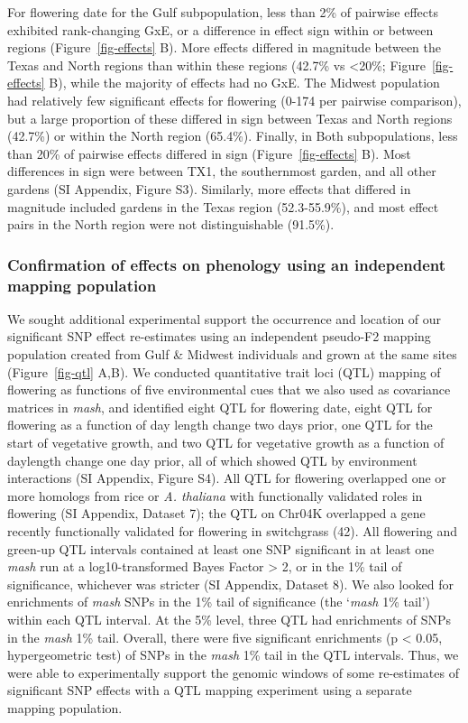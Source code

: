 \documentclass[
  9pt,
  twocolumn,
  twoside]{pnas-new}
\begin{document}
For flowering date for the Gulf subpopulation, less than 2\% of pairwise
effects exhibited rank-changing GxE, or a difference in effect sign
within or between regions (Figure~\ref{fig-effects} B). More effects
differed in magnitude between the Texas and North regions than within
these regions (42.7\% vs \textless20\%; Figure~\ref{fig-effects} B),
while the majority of effects had no GxE. The Midwest population had
relatively few significant effects for flowering (0-174 per pairwise
comparison), but a large proportion of these differed in sign between
Texas and North regions (42.7\%) or within the North region (65.4\%).
Finally, in Both subpopulations, less than 20\% of pairwise effects
differed in sign (Figure~\ref{fig-effects} B). Most differences in sign
were between TX1, the southernmost garden, and all other gardens (SI
Appendix, Figure S3). Similarly, more effects that differed in magnitude
included gardens in the Texas region (52.3-55.9\%), and most effect
pairs in the North region were not distinguishable (91.5\%).

\subsubsection{Confirmation of effects on phenology using an independent
mapping
population}\label{confirmation-of-effects-on-phenology-using-an-independent-mapping-population}

We sought additional experimental support the occurrence and location of
our significant SNP effect re-estimates using an independent pseudo-F2
mapping population created from Gulf \& Midwest individuals and grown at
the same sites (Figure~\ref{fig-qtl} A,B). We conducted quantitative
trait loci (QTL) mapping of flowering as functions of five environmental
cues that we also used as covariance matrices in \emph{mash}, and
identified eight QTL for flowering date, eight QTL for flowering as a
function of day length change two days prior, one QTL for the start of
vegetative growth, and two QTL for vegetative growth as a function of
daylength change one day prior, all of which showed QTL by environment
interactions (SI Appendix, Figure S4). All QTL for flowering overlapped
one or more homologs from rice or \emph{A. thaliana} with functionally
validated roles in flowering (SI Appendix, Dataset 7); the QTL on Chr04K
overlapped a gene recently functionally validated for flowering in
switchgrass (42). All flowering and green-up QTL intervals contained at
least one SNP significant in at least one \emph{mash} run at a
log10-transformed Bayes Factor \textgreater{} 2, or in the 1\% tail of
significance, whichever was stricter (SI Appendix, Dataset 8). We also
looked for enrichments of \emph{mash} SNPs in the 1\% tail of
significance (the `\emph{mash} 1\% tail') within each QTL interval. At
the 5\% level, three QTL had enrichments of SNPs in the \emph{mash} 1\%
tail. Overall, there were five significant enrichments (p \textless{}
0.05, hypergeometric test) of SNPs in the \emph{mash} 1\% tail in the
QTL intervals. Thus, we were able to experimentally support the genomic
windows of some re-estimates of significant SNP effects with a QTL
mapping experiment using a separate mapping population.
\end{document}
